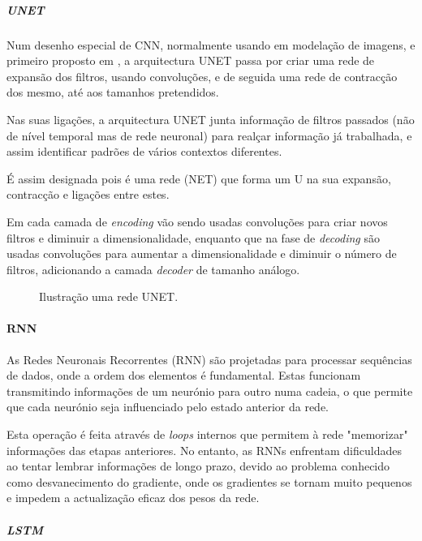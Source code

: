 \subparagraph{UNET\label{se:unet_sec}}
\text{ }  \par
Num desenho especial de \gls{CNN}, normalmente usando em modelação de imagens, e primeiro proposto em \cite{Shelhamer2014}, a arquitectura UNET passa por criar uma rede de expansão dos filtros, usando convoluções, e de seguida uma rede de contracção dos mesmo, até aos tamanhos pretendidos.\par
Nas suas ligações, a arquitectura UNET junta informação de filtros passados (não de nível temporal mas de rede neuronal) para realçar informação já trabalhada, e assim identificar padrões de vários contextos diferentes.\par
É assim designada pois é uma rede (NET) que forma um U na sua expansão, contracção e ligações entre estes.\par
Em cada camada de \textit{encoding} vão sendo usadas convoluções para criar novos filtros e diminuir a dimensionalidade, enquanto que na fase de \textit{decoding} são usadas convoluções para aumentar a dimensionalidade e diminuir o número de filtros, adicionando a camada \textit{decoder} de tamanho análogo.\par

\begin{figure}[H]
	\centering
	\resizebox{\linewidth}{!}{}
	\caption{Ilustração uma rede UNET.}
	\label{fig:unet_graph}
\end{figure}


\paragraph{RNN\label{se:rnn_sec}}
\text{ }  \par

As Redes Neuronais Recorrentes (RNN) são projetadas para processar sequências de dados, onde a ordem dos elementos é fundamental. Estas funcionam transmitindo informações de um neurónio para outro numa cadeia, o que permite que cada neurónio seja influenciado pelo estado anterior da rede.\par
Esta operação é feita através de \textit{loops} internos que permitem à rede "memorizar" informações das etapas anteriores. No entanto, as RNNs enfrentam dificuldades ao tentar lembrar informações de longo prazo, devido ao problema conhecido como desvanecimento do gradiente, onde os gradientes se tornam muito pequenos e impedem a actualização eficaz dos pesos da rede.\par

\subparagraph{LSTM\label{se:lstms_sec}}
\text{ }  \par

